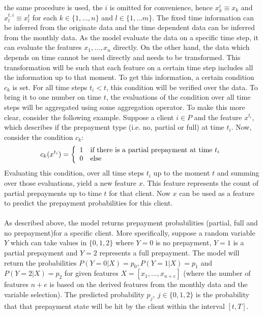     the same procedure 
    is used, the $i$ is omitted for convenience, hence 
    $x_k^i \equiv x_k$ and $x_l^{t, i} \equiv x_l^t$ for each 
    $k \in \{1, \ldots, n\}$ and $l \in \{1, 
    \ldots m \}$.  The fixed time information can be inferred
    from the originate data and the time dependent data can be 
    inferred from the monthly data. As the model evaluate the data on 
    a specific time step, it can evaluate the features 
    $x_1, \ldots, x_n$ directly. On the other hand, the data
    which depends on time cannot be used directly and needs to be 
    transformed. This transformation will be such that each feature 
    on a certain time step includes all the information up to that 
    moment. To get this information, a certain condition $c_k$ is set. 
    For all time steps $t_i < t$, this condition will be verified 
    over the data. To bring it to one number on time $t$, the 
    evaluations of the condition over all time steps will be aggregated 
    using some aggregation operator. To make this more clear, consider 
    the following example. Suppose a client $i \in P$ and the feature 
    $x^{t_i}$, which describes if the prepayment type (i.e. no, partial or 
    full) at time $t_i$. Now, consider the condition $c_k$:
    \begin{equation}
        c_k(x^{t_i}) = \left\{
        \begin{array}{l l l l l}
            1 & \text{if there is a partial prepayment at time } t_i \\ 
            0 & \text{else}
        \end{array}
        \right.
    \end{equation}
    Evaluating this condition, over all time steps $t_i$ up to the moment 
    $t$ and summing over those evaluations, yield a new feature $x$. 
    This feature represents the count of partial prepayments up to time 
    $t$ for that client. Now $x$ can be used as a feature to predict 
    the prepayment probabilities for this client. 
    \\\\
    As described above, the model returns prepayment probabilities 
    (partial, full and no prepayment)for a specific client. More 
    specifically, suppose a random variable $Y$ which can take values in 
    $\{0, 1, 2\}$ where $Y=0$ is no prepayment, 
    $Y=1$ is a partial prepayment and $Y=2$ represents a full prepayment. 
    The model will return the probabilities 
    $P(Y = 0 | X) = p_0, P(Y = 1 | X) = p_1$ and 
    $P(Y = 2 | X) = p_2$
    for given features $X = [x_1, \ldots, x_{n+e}]$ (where the number of 
    features 
    $n+e$ is based on the derived features from the monthly data and 
    the variable selection). The predicted probability 
    $p_j, \ j \in \{0, 1, 2\}$ is the probability 
    that that prepayment state will be hit by the client within the 
    interval $[t, T]$. 

